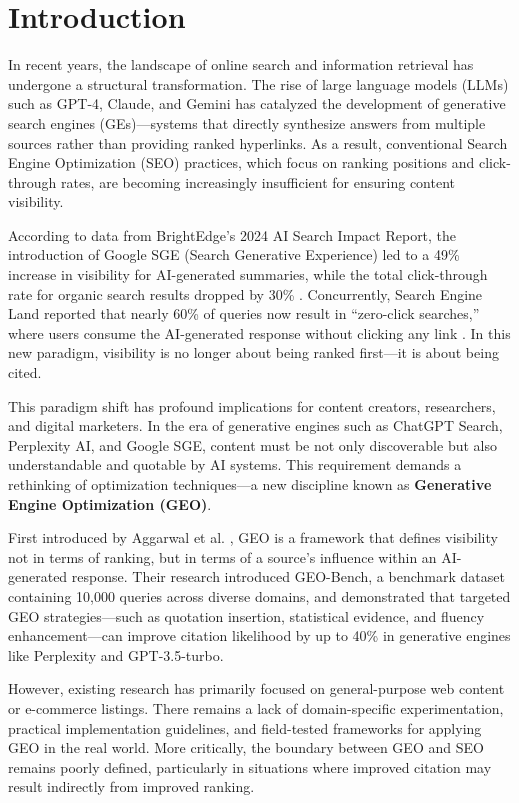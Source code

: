 \section{Introduction}

In recent years, the landscape of online search and information retrieval has undergone a structural transformation. The rise of large language models (LLMs) such as GPT-4, Claude, and Gemini has catalyzed the development of generative search engines (GEs)—systems that directly synthesize answers from multiple sources rather than providing ranked hyperlinks. As a result, conventional Search Engine Optimization (SEO) practices, which focus on ranking positions and click-through rates, are becoming increasingly insufficient for ensuring content visibility.

According to data from BrightEdge’s 2024 AI Search Impact Report, the introduction of Google SGE (Search Generative Experience) led to a 49\% increase in visibility for AI-generated summaries, while the total click-through rate for organic search results dropped by 30\% \cite{lodolce2024gartner}. Concurrently, Search Engine Land reported that nearly 60\% of queries now result in “zero-click searches,” where users consume the AI-generated response without clicking any link \cite{lodolce2024gartner}. In this new paradigm, visibility is no longer about being ranked first—it is about being cited.

This paradigm shift has profound implications for content creators, researchers, and digital marketers. In the era of generative engines such as ChatGPT Search, Perplexity AI, and Google SGE, content must be not only discoverable but also understandable and quotable by AI systems. This requirement demands a rethinking of optimization techniques—a new discipline known as \textbf{Generative Engine Optimization (GEO)}.

First introduced by Aggarwal et al. \cite{aggarwal2024geo}, GEO is a framework that defines visibility not in terms of ranking, but in terms of a source’s influence within an AI-generated response. Their research introduced GEO-Bench, a benchmark dataset containing 10,000 queries across diverse domains, and demonstrated that targeted GEO strategies—such as quotation insertion, statistical evidence, and fluency enhancement—can improve citation likelihood by up to 40\% in generative engines like Perplexity and GPT-3.5-turbo.

However, existing research has primarily focused on general-purpose web content or e-commerce listings. There remains a lack of domain-specific experimentation, practical implementation guidelines, and field-tested frameworks for applying GEO in the real world. More critically, the boundary between GEO and SEO remains poorly defined, particularly in situations where improved citation may result indirectly from improved ranking.

